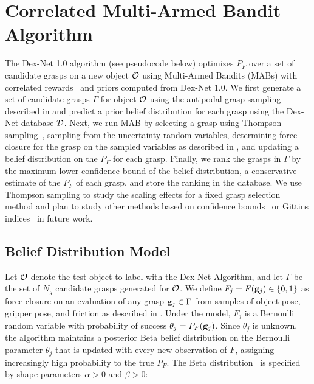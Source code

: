 \section{Correlated Multi-Armed Bandit Algorithm}
The Dex-Net 1.0 algorithm (see pseudocode below) optimizes $P_F$ over a set of candidate grasps on a new object $\mathcal{O}$ using Multi-Armed Bandits (MABs) with correlated rewards~\cite{hoffman2013exploiting, pandey2007multi} and priors computed from Dex-Net 1.0.
We first generate a set of candidate grasps $\Gamma$ for object $\mathcal{O}$ using the antipodal grasp sampling described in  and predict a prior belief distribution for each grasp using the Dex-Net database $\mathcal{D}$.
Next, we run MAB by selecting a grasp using Thompson sampling~\cite{laskey2015bandits, oberlin2015autonomously}, sampling from the uncertainty random variables, determining force closure for the grasp on the sampled variables as described in , and updating a belief distribution on the $P_F$ for each grasp.
Finally, we rank the grasps in $\Gamma$ by the maximum lower confidence bound of the belief distribution, a conservative estimate of the $P_F$ of each grasp, and store the ranking in the database.
We use Thompson sampling to study the scaling effects for a fixed grasp selection method and plan to study other methods based on confidence bounds~\cite{kroemer2010combining, oberlin2015autonomously} or Gittins indices~\cite{laskey2015bandits} in future work.

\subsection{Belief Distribution Model}
Let $\mathcal{O}$ denote the test object to label with the Dex-Net Algorithm, and let $\Gamma$ be the set of $N_g$ candidate grasps generated for $\mathcal{O}$.
We define $F_{j} = F(\mathbf{g}_{j}) \in \{0, 1\}$ as force closure on an evaluation of any grasp $\mathbf{g}_{j} \in \Gamma$ from samples of object pose, gripper pose, and friction as described in .
Under the model, $F_j$ is a Bernoulli random variable with probability of success $\theta_{j}= P_F(\mathbf{g}_{j})$.
Since $\theta_j$ is unknown, the algorithm maintains a posterior Beta belief distribution on the Bernoulli parameter $\theta_{j}$ that is updated with every new observation of $F$, assigning increasingly high probability to the true $P_F$. 
The Beta distribution~\cite{hoffman2013exploiting, laskey2015bandits} is specified by shape parameters $\alpha > 0$ and $\beta > 0$:

